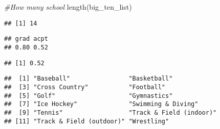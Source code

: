 \documentclass[
]{article}
\newenvironment{Shaded}{\begin{snugshade}}{\end{snugshade}}
\newcommand{\CommentTok}[1]{\textcolor[rgb]{0.56,0.35,0.01}{\textit{#1}}}
\newcommand{\DecValTok}[1]{\textcolor[rgb]{0.00,0.00,0.81}{#1}}
\newcommand{\FunctionTok}[1]{\textcolor[rgb]{0.00,0.00,0.00}{#1}}
\newcommand{\NormalTok}[1]{#1}
\newcommand{\SpecialCharTok}[1]{\textcolor[rgb]{0.00,0.00,0.00}{#1}}
\begin{document}
\begin{Shaded}
\begin{Highlighting}[]
\CommentTok{\#How many school }
\FunctionTok{length}\NormalTok{(big\_ten\_list)}
\end{Highlighting}
\end{Shaded}

\begin{verbatim}
## [1] 14
\end{verbatim}

\begin{Shaded}
\end{Shaded}

\begin{verbatim}
## grad acpt 
## 0.80 0.52
\end{verbatim}

\begin{Shaded}
\end{Shaded}

\begin{verbatim}
## [1] 0.52
\end{verbatim}

\begin{Shaded}
\end{Shaded}

\begin{verbatim}
##  [1] "Baseball"                "Basketball"             
##  [3] "Cross Country"           "Football"               
##  [5] "Golf"                    "Gymnastics"             
##  [7] "Ice Hockey"              "Swimming & Diving"      
##  [9] "Tennis"                  "Track & Field (indoor)" 
## [11] "Track & Field (outdoor)" "Wrestling"
\end{verbatim}
\end{document}
